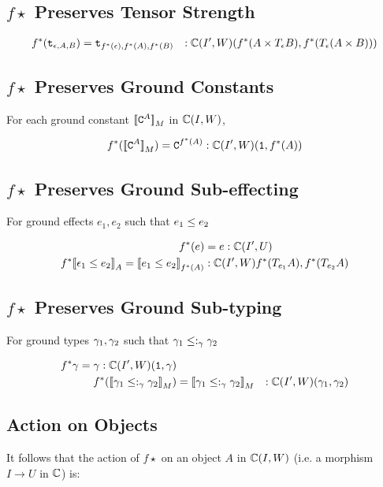 \documentclass{report}
\begin{document}
\subsection{$f\star$ Preserves Tensor Strength}
\begin{align}
    f^*(\texttt{t}_{\epsilon, A, B}) &= \texttt{t}_{f^*(\epsilon), f^*(A), f^*(B)} &: \mathbb{C}(I', W)(f^*(A\times T_{\epsilon}{B}), f^*(T_{\epsilon}{(A\times B)}))
\end{align}
\subsection{$f\star$ Preserves Ground Constants}
For each ground constant ${\bf [\![}\texttt{C}^{A}{\bf ]\!]}_M$ in $\mathbb{C}(I, W)$,

\begin{align}
    f^*({\bf [\![}\texttt{C}^{A}{\bf ]\!]}_M) = \texttt{C}^{f^*(A)} : \mathbb{C}(I', W)(\texttt{1}, f^*(A))
\end{align}
\subsection{$f\star$ Preserves Ground Sub-effecting}
For ground effects $e_1, e_2$ such that $e_1\leq e_2$



\begin{align}
    f^*(e) & = e: \mathbb{C}(I', U)\\
    f^*{\bf [\![}\epsilon_1\leq e_2{\bf ]\!]}_A = {\bf [\![}e_1 \leq e_2{\bf ]\!]}_{f^*(A)} &:\mathbb{C}(I', W){f^*(T_{e_1}{A}), f^*(T_{e_2}{A})} \\
\end{align}
\subsection{$f\star$ Preserves Ground Sub-typing}
For ground types $\gamma_1, \gamma_2$ such that $\gamma_1\leq:_\gamma\gamma_2$

\begin{align}
    f^*{\gamma} = \gamma: \mathbb{C}(I', W)(\texttt{1}, \gamma)\\
    f^*({\bf [\![}\gamma_1 \leq:_\gamma \gamma_2{\bf ]\!]}_M) & = {\bf [\![}\gamma_1 \leq:_\gamma \gamma_2{\bf ]\!]}_M &: \mathbb{C}(I', W)(\gamma_1, \gamma_2)\\
\end{align}

\subsection{Action on Objects}

It follows that the action of $f\star$ on an object $A$ in $\mathbb{C}(I, W)$ (i.e. a morphism $I \rightarrow U$ in $\mathbb{C}$) is:
\end{document}
